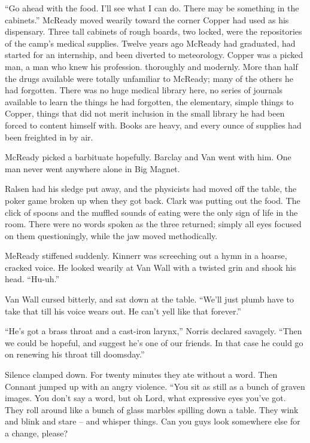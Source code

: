 \documentclass[letterpaper,openany,12pt]{memoir}		%
\begin{document}
``Go ahead with the food. I'll see what I can do. There may be something in the
cabinets.'' McReady moved wearily toward the corner Copper had used as his
dispensary. Three tall cabinets of rough boards, two locked, were the
repositories of the camp's medical supplies. Twelve years ago McReady had
graduated, had started for an internship, and been diverted to meteorology.
Copper was a picked man, a man who knew his profession. thoroughly and modernly.
More than half the drugs available were totally unfamiliar to McReady; many of
the others he had forgotten. There was no huge medical library here, no series
of journals available to learn the things he had forgotten, the elementary,
simple things to Copper, things that did not merit inclusion in the small
library he had been forced to content himself with. Books are heavy, and every
ounce of supplies had been freighted in by air.

McReady picked a barbituate hopefully. Barclay and Van went with him. One man
never went anywhere alone in Big Magnet.

Ralsen had his sledge put away, and the physicists had moved off the table, the
poker game broken up when they got back. Clark was putting out the food. The
click of spoons and the muffled sounds of eating were the only sign of life in
the room. There were no words spoken as the three returned; simply all eyes
focused on them questioningly, while the jaw moved methodically.

MeReady stiffened suddenly. Kinnerr was screeching out a hymn in a hoarse,
cracked voice. He looked wearily at Van Wall with a twisted grin and shook his
head. ``Hu-uh.''

Van Wall cursed bitterly, and sat down at the table. ``We'll just plumb have to
take that till his voice wears out. He can't yell like that forever.''

``He's got a brass throat and a cast-iron larynx,'' Norris declared savagely.
``Then we could be hopeful, and suggest he's one of our friends. In that case he
could go on renewing his throat till doomsday.''

Silence clamped down. For twenty minutes they ate without a word. Then Connant
jumped up with an angry violence. ``You sit as still as a bunch of graven
images. You don't say a word, but oh Lord, what expressive eyes you've got. They
roll around like a bunch of glass marbles spilling down a table. They wink and
blink and stare -- and whisper things. Can you guys look somewhere else for a
change, please?
\end{document}
